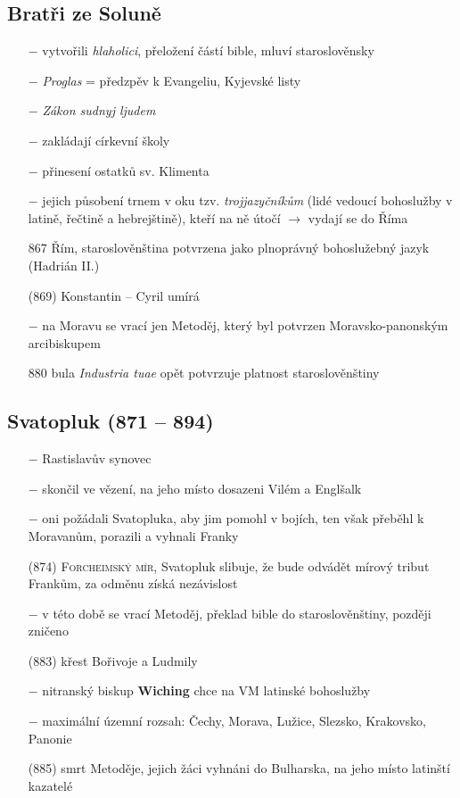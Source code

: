 \documentclass{article}
\begin{document}
\subsection*{Bratři ze Soluně}
\begin{itemize}
    \vspace{-0.5em}
    \setlength\itemsep{0.15em}
    \item[$-$] vytvořili \textit{hlaholici}, přeložení částí bible, mluví staroslověnsky
    \item[$-$] \textit{Proglas} = předzpěv k Evangeliu, Kyjevské listy
    \item[$-$] \textit{Zákon sudnyj ljudem}
    \item[$-$] zakládají církevní školy
    \item[$-$] přinesení ostatků sv. Klimenta
    \item[$-$] jejich působení trnem v oku tzv. \textit{trojjazyčníkům} (lidé vedoucí bohoslužby v latině, řečtině a hebrejštině), kteří na ně útočí $\rightarrow$ vydají se do Říma
    \item[867] Řím, staroslověnština potvrzena jako plnoprávný bohoslužebný jazyk (Hadrián II.)
    \item[(869)] Konstantin -- Cyril umírá
    \item[$-$] na Moravu se vrací jen Metoděj, který byl potvrzen Moravsko-panonským arcibiskupem
    \item[880] bula \textit{Industria tuae} opět potvrzuje platnost staroslověnštiny
\end{itemize}

\subsection*{Svatopluk (871 -- 894)}
\begin{itemize}
    \vspace{-0.5em}
    \setlength\itemsep{0.15em}
    \item[$-$] Rastislavův synovec
    \item[$-$] skončil ve vězení, na jeho místo dosazeni Vilém a Englšalk
    \item[$-$] oni požádali Svatopluka, aby jim pomohl v bojích, ten však přeběhl k Moravanům, porazili a vyhnali Franky
    \item[(874)] \textsc{Forcheimský mír}, Svatopluk slibuje, že bude odvádět mírový tribut Frankům, za odměnu získá nezávislost
    \item[$-$] v této době se vrací Metoděj, překlad bible do staroslověnštiny, později zničeno
    \item[(883)] křest Bořivoje a Ludmily
    \item[$-$] nitranský biskup \textbf{Wiching} chce na VM latinské bohoslužby
    \item[$-$] maximální územní rozsah: Čechy, Morava, Lužice, Slezsko, Krakovsko, Panonie
    \item[(885)] smrt Metoděje, jejich žáci vyhnáni do Bulharska, na jeho místo latinští kazatelé
\end{itemize}
\end{document}
